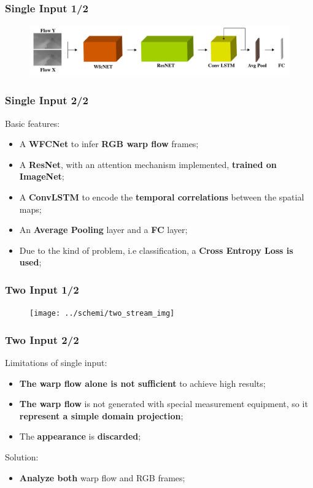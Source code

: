\documentclass{beamer}
\begin{document}
\begin{frame}
\frametitle{Single Input 1/2}

\begin{figure}
\centering
\includegraphics[width=\textwidth]{../schemi/single_stream}
\end{figure}
 
\end{frame}

\begin{frame}
\frametitle{Single Input 2/2}

Basic features:
\begin{itemize}
\item A \textbf{WFCNet} to infer \textbf{RGB warp flow} frames;
\item A \textbf{ResNet}, with an attention mechanism implemented, \textbf{trained on ImageNet};
\item A \textbf{ConvLSTM} to encode the \textbf{temporal correlations} between the spatial maps; %
\item An \textbf{Average Pooling} layer and a \textbf{FC} layer;
\item Due to the kind of problem, i.e classification, a \textbf{Cross Entropy Loss is used};
\end{itemize}
 
\end{frame}

\begin{frame}
\frametitle{Two Input 1/2}

\begin{figure}
\centering
\texttt{[image: ../schemi/two\_stream\_img]}
\end{figure}
 
\end{frame}

\begin{frame}
\frametitle{Two Input 2/2}
Limitations of single input:
\begin{itemize}
\item \textbf{The warp flow alone is not sufficient} to achieve high results;
\item \textbf{The warp flow} is not generated with special measurement equipment, so it \textbf{represent a simple domain projection};
\item The \textbf{appearance} is \textbf{discarded};
\end{itemize}

Solution:
\begin{itemize}
\item \textbf{Analyze both} warp flow and RGB frames;
\end{itemize}
\end{frame}
  
\end{document}

